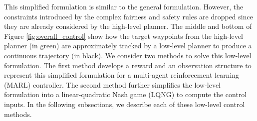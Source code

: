 This simplified formulation is similar to the general formulation. However, the constraints introduced by the complex fairness and safety rules are dropped since they are already considered by the high-level planner. The middle and bottom of Figure \ref{fig:overall_control} show how the target waypoints from the high-level planner (in green) are approximately tracked by a low-level planner to produce a continuous trajectory (in black). We consider two methods to solve this low-level formulation. The first method develops a reward and an observation structure to represent this simplified formulation for a multi-agent reinforcement learning (MARL) controller. The second method further simplifies the low-level formulation into a linear-quadratic Nash game (LQNG) to compute the control inputs. In the following subsections, we describe each of these low-level control methods.


